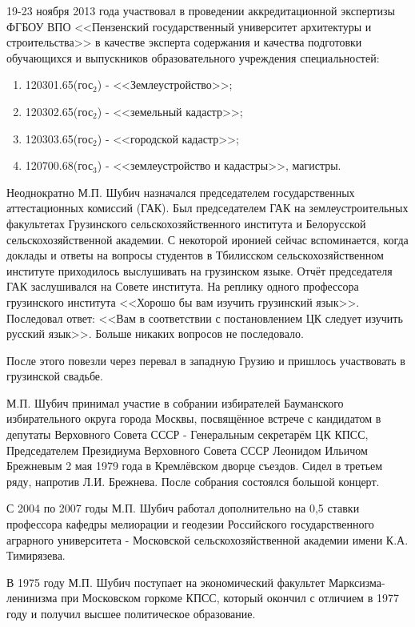 19-23 ноября 2013 года участвовал в проведении аккредитационной экспертизы ФГБОУ ВПО <<Пензенский государственный университет архитектуры и строительства>> в качестве эксперта содержания и качества подготовки обучающихся и выпускников образовательного учреждения специальностей:

\begin{enumerate}
	\item 120301.65(гос$_2$) - <<Землеустройство>>; 
	\item 120302.65(гос$_2$) - <<земельный кадастр>>; 
	\item 120303.65(гос$_2$) - <<городской кадастр>>; 
 	\item 120700.68(гос$_3$) - <<землеустройство и кадастры>>, магистры.
\end{enumerate}

Неоднократно М.П. Шубич назначался председателем государственных аттестационных комиссий (ГАК). Был председателем ГАК на землеустроительных факультетах Грузинского сельскохозяйственного института и Белорусской сельскохозяйственной академии. С некоторой иронией сейчас вспоминается, когда доклады и ответы на вопросы студентов в Тбилисском сельскохозяйственном институте приходилось выслушивать на грузинском языке. Отчёт председателя ГАК заслушивался на Совете института. На реплику одного профессора грузинского института <<Хорошо бы вам изучить грузинский язык>>. Последовал ответ: <<Вам в соответствии с постановлением ЦК следует изучить русский язык>>. Больше никаких вопросов не последовало.

После этого повезли через перевал в западную Грузию и пришлось участвовать в грузинской свадьбе.

М.П. Шубич принимал участие в собрании избирателей Бауманского избирательного округа города Москвы, посвящённое встрече с кандидатом в депутаты Верховного Совета СССР - Генеральным секретарём ЦК КПСС, Председателем Президиума Верховного Совета СССР Леонидом Ильичом Брежневым 2 мая 1979 года в Кремлёвском дворце съездов. Сидел в третьем ряду, напротив Л.И. Брежнева. После собрания состоялся большой концерт. 

С 2004 по 2007 годы М.П. Шубич работал дополнительно на 0,5 ставки профессора кафедры мелиорации и геодезии Российского государственного аграрного университета - Московской сельскохозяйственной академии имени К.А. Тимирязева.

В 1975 году М.П. Шубич поступает на экономический факультет Марксизма-ленинизма при Московском горкоме КПСС, который окончил с отличием в 1977 году и получил высшее политическое образование.

